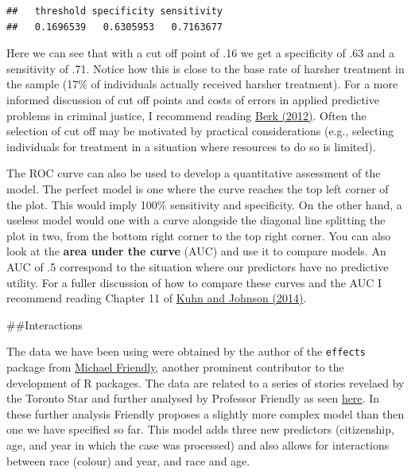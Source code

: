 \documentclass[]{book}
\theoremstyle{definition}
\theoremstyle{definition}
\theoremstyle{definition}
\theoremstyle{remark}
\begin{document}
\begin{verbatim}
##   threshold specificity sensitivity 
##   0.1696539   0.6305953   0.7163677
\end{verbatim}

Here we can see that with a cut off point of .16 we get a specificity of
.63 and a sensitivity of .71. Notice how this is close to the base rate
of harsher treatment in the sample (17\% of individuals actually
received harsher treatment). For a more informed discussion of cut off
points and costs of errors in applied predictive problems in criminal
justice, I recommend reading
\href{http://link.springer.com/book/10.1007\%2F978-1-4614-3085-8}{Berk
(2012)}. Often the selection of cut off may be motivated by practical
considerations (e.g., selecting individuals for treatment in a situation
where resources to do so is limited).

The ROC curve can also be used to develop a quantitative assessment of
the model. The perfect model is one where the curve reaches the top left
corner of the plot. This would imply 100\% sensitivity and specificity.
On the other hand, a useless model would one with a curve alongside the
diagonal line splitting the plot in two, from the bottom right corner to
the top right corner. You can also look at the \textbf{area under the
curve} (AUC) and use it to compare models. An AUC of .5 correspond to
the situation where our predictors have no predictive utility. For a
fuller discussion of how to compare these curves and the AUC I recommend
reading Chapter 11 of
\href{http://link.springer.com/book/10.1007/978-1-4614-6849-3}{Kuhn and
Johnson (2014)}.

\#\#Interactions

The data we have been using were obtained by the author of the
\texttt{effects} package from \href{http://www.datavis.ca/}{Michael
Friendly}, another prominent contributor to the development of R
packages. The data are related to a series of stories revelaed by the
Toronto Star and further analysed by Professor Friendly as seen
\href{http://www.datavis.ca/courses/VCD/vcd4-handout-2x2.pdf}{here}. In
these further analysis Friendly proposes a slightly more complex model
than then one we have specified so far. This model adds three new
predictors (citizenship, age, and year in which the case was processed)
and also allows for interactions between race (colour) and year, and
race and age.
\end{document}
